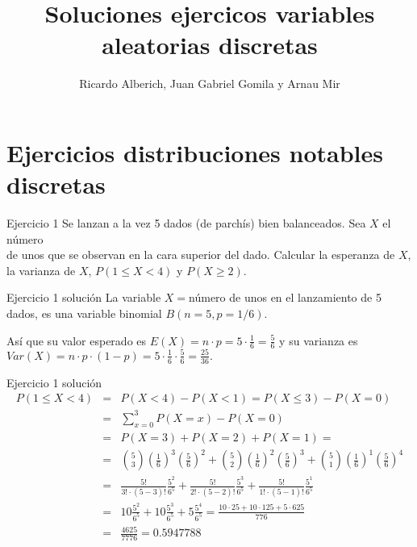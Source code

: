 \documentclass[
  ignorenonframetext,
]{beamer}
\title{Soluciones ejercicos variables aleatorias discretas}
\author{Ricardo Alberich, Juan Gabriel Gomila y Arnau Mir}
\date{}
\begin{document}
\frame{\titlepage}

\hypertarget{ejercicios-distribuciones-notables-discretas}{%
\section{Ejercicios distribuciones notables
discretas}\label{ejercicios-distribuciones-notables-discretas}}

\begin{frame}{Ejercicio 1}
\protect\hypertarget{ejercicio-1}{}
Se lanzan a la vez 5 dados (de parchís) bien balanceados. Sea \(X\) el
número\\
de unos que se observan en la cara superior del dado. Calcular la
esperanza de \(X\), la varianza de \(X\), \(P(1\leq X<4)\) y
\(P(X\geq 2).\)
\end{frame}

\begin{frame}{Ejercicio 1 solución}
\protect\hypertarget{ejercicio-1-soluciuxf3n}{}
La variable \(X=\)número de unos en el lanzamiento de 5 dados, es una
variable binomial \(B(n=5,p=1/6)\).

Así que su valor esperado es
\(E(X)=n\cdot p = 5\cdot \frac{1}{6}=\frac56\) y su varianza es
\(Var(X)=n\cdot p\cdot (1-p)= 5\cdot \frac16\cdot \frac56=\frac{25}{36}.\)
\end{frame}

\begin{frame}{Ejercicio 1 solución}
\protect\hypertarget{ejercicio-1-soluciuxf3n-1}{}
\[
\begin{array}{lll}
P(1\leq X< 4)&=&P(X<4)-P(X<1)=P(X\leq 3)-P(X=0)\\
&=&\sum_{x=0}^3 P(X=x)-P(X=0)\\
&=&
P(X=3)+P(X=2)+P(X=1)=
\\
&=& {5 \choose 3} \left(\frac16\right)^3 \left(\frac56\right)^2+
{5 \choose 2} \left(\frac16\right)^2 \left(\frac56\right)^3+
{5 \choose 1} \left(\frac16\right)^1 \left(\frac56\right)^4
\\
&=&
\frac{5!}{3!\cdot (5-3)!} \frac{5^2}{6^5}+
\frac{5!}{2!\cdot (5-2)!} \frac{5^3}{6^5}+
\frac{5!}{1!\cdot (5-1)!} \frac{5^1}{6^5} \\
&=&
10 \frac{5^2}{6^5}+
10 \frac{5^3}{6^5}+
5 \frac{5^4}{6^5}=\frac{10\cdot 25 +10 \cdot 125 +5\cdot 625}{776}\\&=&
\frac{4625}{7776}=0.5947788 
\end{array}
\]
\end{frame}
\end{document}
